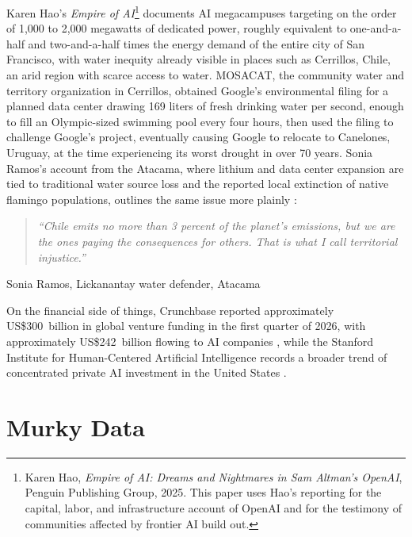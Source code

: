 \documentclass[10pt,a4paper,twocolumn]{article}
\begin{document}
Karen Hao's \emph{Empire of AI}\footnote{Karen Hao, \emph{Empire of AI: Dreams and Nightmares in Sam Altman's OpenAI}, Penguin Publishing Group, 2025. This paper uses Hao's reporting for the capital, labor, and infrastructure account of OpenAI and for the testimony of communities affected by frontier AI build out.} documents AI megacampuses targeting on the order of 1{,}000 to 2{,}000 megawatts of dedicated power, roughly equivalent to one-and-a-half and two-and-a-half times the energy demand of the entire city of San Francisco, with water inequity already visible in places such as Cerrillos, Chile, an arid region with scarce access to water. MOSACAT, the community water and territory organization in Cerrillos, obtained Google's environmental filing for a planned data center drawing 169 liters of fresh drinking water per second, enough to fill an Olympic-sized swimming pool every four hours, then used the filing to challenge Google's project, eventually causing Google to relocate to Canelones, Uruguay, at the time experiencing its worst drought in over 70 years. Sonia Ramos's account from the Atacama, where lithium and data center expansion are tied to traditional water source loss and the reported local extinction of native flamingo populations, outlines the same issue more plainly \citep[ch.~12]{hao2025empire}:

\begin{quote}
\itshape\small ``Chile emits no more than 3 percent of the planet's emissions, but we are the ones paying the consequences for others. That is what I call territorial injustice.''
\end{quote}
\noindent\hspace*{1em}Sonia Ramos, Lickanantay water defender, Atacama \citep{iied2024ramos}
\smallskip

On the financial side of things, Crunchbase reported approximately US\$300~billion in global venture funding in the first quarter of 2026, with approximately US\$242~billion flowing to AI companies \citep{crunchbase2026q1}, while the Stanford Institute for Human-Centered Artificial Intelligence records a broader trend of concentrated private AI investment in the United States \citep{stanfordhai2025index}.

\section{Murky Data}
\label{sec:murky-data}
\end{document}
